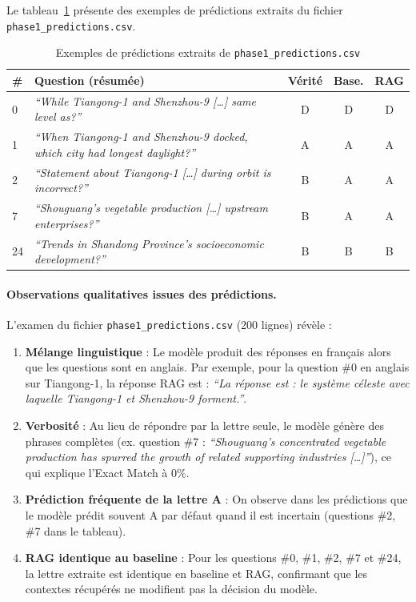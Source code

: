 \documentclass[12pt,a4paper]{article}
\begin{document}
Le tableau~\ref{tab:examples} présente des exemples de prédictions extraits du fichier \texttt{phase1\_predictions.csv}.

\begin{table}[H]
\centering
\caption{Exemples de prédictions extraits de \texttt{phase1\_predictions.csv}}
\label{tab:examples}
\small
\begin{tabularx}{\textwidth}{@{} p{0.6cm} X c c c @{}}
\toprule
\textbf{\#} & \textbf{Question (résumée)} & \textbf{Vérité} & \textbf{Base.} & \textbf{RAG} \\
\midrule
0 & \textit{``While Tiangong-1 and Shenzhou-9 [\ldots] same level as?''} & D & D & D \\
\rowcolor{lightgray}
1 & \textit{``When Tiangong-1 and Shenzhou-9 docked, which city had longest daylight?''} & A & A & A \\
2 & \textit{``Statement about Tiangong-1 [\ldots] during orbit is incorrect?''} & B & A & A \\
\rowcolor{lightgray}
7 & \textit{``Shouguang's vegetable production [\ldots] upstream enterprises?''} & B & A & A \\
24 & \textit{``Trends in Shandong Province's socioeconomic development?''} & B & B & B \\
\bottomrule
\end{tabularx}
\end{table}

\paragraph{Observations qualitatives issues des prédictions.} L'examen du fichier \texttt{phase1\_predictions.csv} (200 lignes) révèle :

\begin{enumerate}[leftmargin=*]
  \item \textbf{Mélange linguistique} : Le modèle produit des réponses en français alors que les questions sont en anglais. Par exemple, pour la question \#0 en anglais sur Tiangong-1, la réponse RAG est : \textit{``La réponse est : le système céleste avec laquelle Tiangong-1 et Shenzhou-9 forment.''}.

  \item \textbf{Verbosité} : Au lieu de répondre par la lettre seule, le modèle génère des phrases complètes (ex. question \#7 : \textit{``Shouguang's concentrated vegetable production has spurred the growth of related supporting industries [\ldots]''}), ce qui explique l'Exact Match à 0\%.

  \item \textbf{Prédiction fréquente de la lettre A} : On observe dans les prédictions que le modèle prédit souvent A par défaut quand il est incertain (questions \#2, \#7 dans le tableau).

  \item \textbf{RAG identique au baseline} : Pour les questions \#0, \#1, \#2, \#7 et \#24, la lettre extraite est identique en baseline et RAG, confirmant que les contextes récupérés ne modifient pas la décision du modèle.
\end{enumerate}
\end{document}
